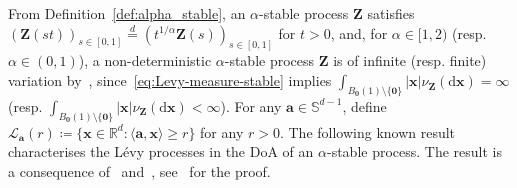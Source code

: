\documentclass[en,oneside,bbfont,article]{amsart}
\theoremstyle{remark}
\theoremstyle{definition}
\theoremstyle{definition}
\newcommand\Sp{\mathbb{S}}
\newcommand\scrL{\mathscr{L}}
\newcommand\R{\mathbb{R}}
\newcommand\1{\mathds{1}}
\renewcommand\ge{\geqslant}
\newcommand\eqd{\overset{d}{=}}
\newcommand{\D}{\mathrm{d}}
\begin{document}
From Definition~\ref{def:alpha_stable}, an $\alpha$-stable process $\bm{Z}$ satisfies $(\bm{Z}(st))_{s\in[0,1]}\eqd (t^{1/\alpha}\bm{Z}(s))_{s\in[0,1]}$ for $t>0$, and, for $\alpha\in[1,2)$ (resp. $\alpha\in(0,1)$), a non-deterministic $\alpha$-stable process $\bm{Z}$ is of infinite (resp. finite) variation by~\cite[Thm~21.9]{MR3185174}, since~\eqref{eq:Levy-measure-stable} implies  $\int_{B_{\bm{0}}(1)\setminus\{\bm0\}}|\bm{x}|\nu_{\bm{Z}}(\D\bm{x})=\infty$ (resp. $\int_{B_{\bm{0}}(1)\setminus\{\bm0\}}|\bm{x}|\nu_{\bm{Z}}(\D\bm{x})<\infty$). %
For any $\bm{a}\in \Sp^{d-1}$, define $\scrL_{\bm{a}}(r)\coloneqq\{\bm{x}\in\R^d:\langle\bm{a},\bm{x}\rangle\ge r\}$ for any $r>0$. The following known result characterises the L\'evy processes in the DoA of an $\alpha$-stable process. The result is a consequence of~\cite[Thm~15.14]{MR1876169} and~\cite[Thm~2]{MR3784492}, see~\cite[App.~B]{WassersteinPaper} for the proof.
\end{document}
